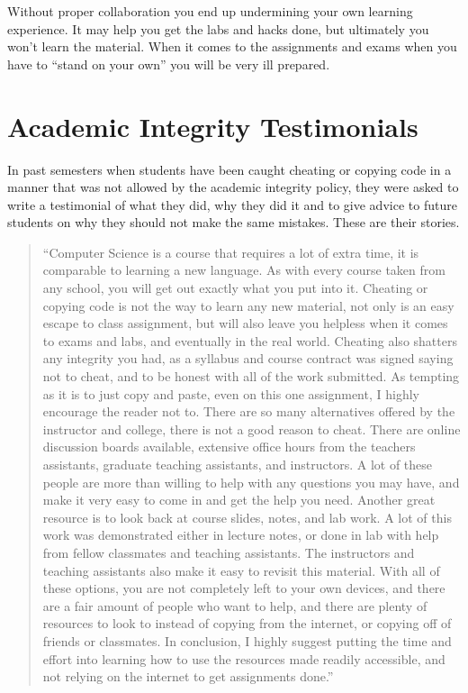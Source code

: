 \documentclass[12pt]{scrartcl}
\begin{document}
Without proper collaboration you end up undermining your own 
learning experience.  It may help you get the labs and hacks done, 
but ultimately you won't learn the material.  When it comes to
the assignments and exams when you have to ``stand on your own''
you will be very ill prepared.  

\newpage
\section*{Academic Integrity Testimonials}

In past semesters when students have been caught cheating or copying code in
a manner that was not allowed by the academic integrity policy, they were asked
to write a testimonial of what they did, why they did it and to give advice
to future students on why they should not make the same mistakes.  These
are their stories.

\begin{quote}
``Computer Science is a course that requires a lot of extra time, it is comparable to learning a new language. As with every course taken from any school, you will get out exactly what you put into it. Cheating or copying code is not the way to learn any new material, not only is an easy escape to class assignment, but will also leave you helpless when it comes to exams and labs, and eventually in the real world. Cheating also shatters any integrity you had, as a syllabus and course contract was signed saying not to cheat, and to be honest with all of the work submitted. As tempting as it is to just copy and paste, even on this one assignment, I highly encourage the reader not to. There are so many alternatives offered by the instructor and college, there is not a good reason to cheat. There are online discussion boards available, extensive office hours from the teachers assistants, graduate teaching assistants, and instructors. A lot of these people are more than willing to help with any questions you may have, and make it very easy to come in and get the help you need. Another great resource is to look back at course slides, notes, and lab work. A lot of this work was demonstrated either in lecture notes, or done in lab with help from fellow classmates and teaching assistants. The instructors and teaching assistants also make it easy to revisit this material.  With all of these options, you are not completely left to your own devices, and there are a fair amount of people who want to help, and there are plenty of resources to look to instead of copying from the internet, or copying off of friends or classmates. In conclusion, I highly suggest putting the time and effort into learning how to use the resources made readily accessible, and not relying on the internet to get assignments done.'' 
\end{quote}
\end{document}

